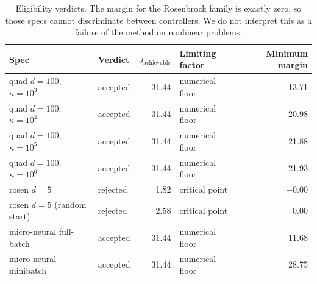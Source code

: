 \begin{table}[!ht]
  \centering
  \begin{tabular}{llrlr}
  \toprule
  Spec & Verdict & $J_{\text{achievable}}$ & Limiting factor & Minimum margin \\
  \midrule
  quad $d{=}100$, $\kappa{=}10^3$ & accepted & 31.44 & numerical floor & 13.71 \\
  quad $d{=}100$, $\kappa{=}10^4$ & accepted & 31.44 & numerical floor & 20.98 \\
  quad $d{=}100$, $\kappa{=}10^5$ & accepted & 31.44 & numerical floor & 21.88 \\
  quad $d{=}100$, $\kappa{=}10^6$ & accepted & 31.44 & numerical floor & 21.93 \\
  rosen $d{=}5$                   & rejected & 1.82  & critical point  & $-0.00$ \\
  rosen $d{=}5$ (random start)    & rejected & 2.58  & critical point  & 0.00 \\
  micro-neural full-batch         & accepted & 31.44 & numerical floor & 11.68 \\
  micro-neural minibatch          & accepted & 31.44 & numerical floor & 28.75 \\
  \bottomrule
  \end{tabular}
  \caption{Eligibility verdicts. The margin for the Rosenbrock family is exactly
  zero, so those specs cannot discriminate between controllers. We do not
  interpret this as a failure of the method on nonlinear problems.}
  \label{tab:eligibility}
\end{table}
